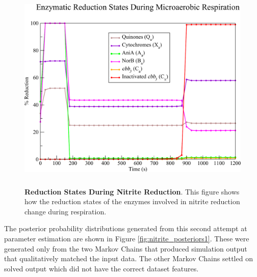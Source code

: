 \begin{figure}[tbp]
 \centering
 \includegraphics[height=10cm, clip=true]{./07-nitritereduction/data/dataset2redox-2.pdf}
 \caption[Reduction States During Nitrite Reduction]{{\bf Reduction States During Nitrite Reduction}. This figure shows how the reduction states of the enzymes involved in nitrite reduction change during respiration.
  \label{fig:nitrite_ds2_redox2}}
\end{figure}

The posterior probability distributions generated from this second attempt at parameter estimation are shown in Figure \ref{fig:nitrite_posteriors1}. These were generated only from the two Markov Chains that produced simulation output that qualitatively matched the input data. The other Markov Chains settled on solved output which did not have the correct dataset features.


